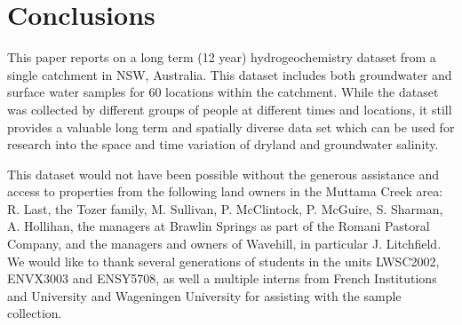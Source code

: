 \documentclass[, manuscript]{copernicus}
\begin{document}
\section{Conclusions}

This paper reports on a long term (12 year) hydrogeochemistry dataset
from a single catchment in NSW, Australia. This dataset includes both
groundwater and surface water samples for 60 locations within the
catchment. While the dataset was collected by different groups of people
at different times and locations, it still provides a valuable long term
and spatially diverse data set which can be used for research into the
space and time variation of dryland and groundwater salinity.











\begin{acknowledgements}
This dataset would not have been possible without the generous
assistance and access to properties from the following land owners in
the Muttama Creek area: R. Last, the Tozer family, M. Sullivan, P.
McClintock, P. McGuire, S. Sharman, A. Hollihan, the managers at Brawlin
Springs as part of the Romani Pastoral Company, and the managers and
owners of Wavehill, in particular J. Litchfield. We would like to thank
several generations of students in the units LWSC2002, ENVX3003 and
ENSY5708, as well a multiple interns from French Institutions and
University and Wageningen University for assisting with the sample
collection.
\end{acknowledgements}
\end{document}
